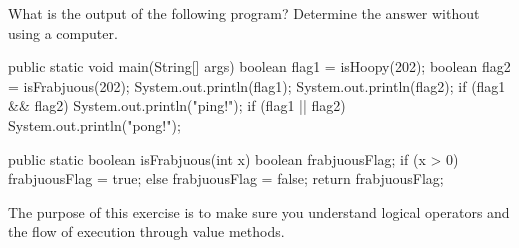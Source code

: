 \newpage
\begin{exercise}  %

What is the output of the following program?
Determine the answer without using a computer.

\begin{code}
public static void main(String[] args) {
    boolean flag1 = isHoopy(202);
    boolean flag2 = isFrabjuous(202);
    System.out.println(flag1);
    System.out.println(flag2);
    if (flag1 && flag2) {
        System.out.println("ping!");
    }
    if (flag1 || flag2) {
        System.out.println("pong!");
    }
}
\end{code}


\begin{code}
public static boolean isFrabjuous(int x) {
    boolean frabjuousFlag;
    if (x > 0) {
        frabjuousFlag = true;
    } else {
        frabjuousFlag = false;
    }
    return frabjuousFlag;
}
\end{code}

The purpose of this exercise is to make sure you understand logical operators and the flow of execution through value methods.

\end{exercise}


